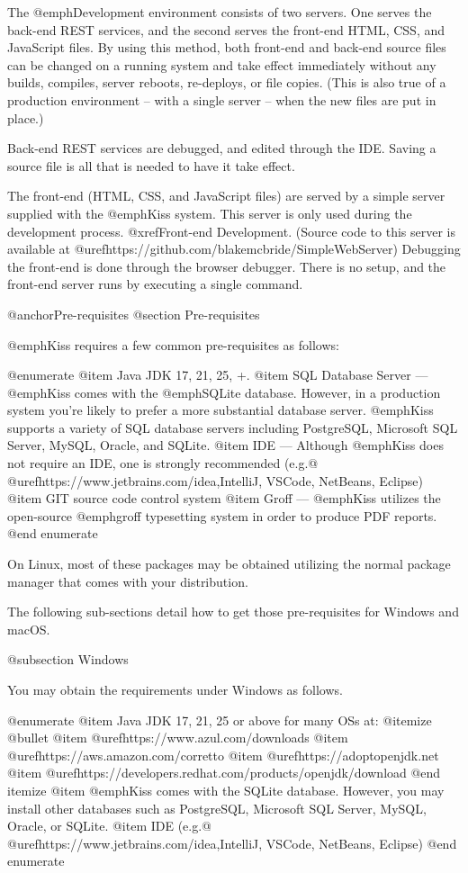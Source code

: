 The @emph{Development} environment consists of two servers.  One
serves the back-end REST services, and the second serves the front-end
HTML, CSS, and JavaScript files.  By using this method, both front-end
and back-end source files can be changed on a running system and take
effect immediately without any builds, compiles, server reboots,
re-deploys, or file copies.  (This is also true of a production
environment -- with a single server -- when the new files are put in place.)

Back-end REST services are debugged, and edited through the IDE.
Saving a source file is all that is needed to have it take effect.

The front-end (HTML, CSS, and JavaScript files) are served by a simple
server supplied with the @emph{Kiss} system.  This server is only used
during the development process.  @xref{Front-end Development}.
(Source code to this server is available at
@uref{https://github.com/blakemcbride/SimpleWebServer}) Debugging the
front-end is done through the browser debugger.  There is no setup,
and the front-end server runs by executing a single command.

@anchor{Pre-requisites}
@section Pre-requisites

@emph{Kiss} requires a few common pre-requisites as follows:


@enumerate
@item
Java JDK 17, 21, 25, +. 
@item
SQL Database Server --- @emph{Kiss} comes with the @emph{SQLite} database.  However, in a production
system you're likely to prefer a more substantial database server.  @emph{Kiss} supports a variety of SQL database servers including 
PostgreSQL, Microsoft SQL Server, MySQL, Oracle, and SQLite.
@item
IDE --- Although @emph{Kiss} does not require an IDE, one is strongly recommended (e.g.@ @uref{https://www.jetbrains.com/idea,IntelliJ}, VSCode, NetBeans, Eclipse)
@item
GIT source code control system
@item
Groff --- @emph{Kiss} utilizes the open-source @emph{groff} typesetting system in order to produce PDF reports.
@end enumerate

On Linux, most of these packages may be obtained utilizing the normal
package manager that comes with your distribution.

The following sub-sections detail how to get those pre-requisites for Windows and macOS.

@subsection Windows


You may obtain the requirements under Windows as follows.

@enumerate
@item
Java JDK 17, 21, 25 or above for many OSs at:
@itemize @bullet
@item
@uref{https://www.azul.com/downloads}
@item
@uref{https://aws.amazon.com/corretto}
@item
@uref{https://adoptopenjdk.net}
@item
@uref{https://developers.redhat.com/products/openjdk/download}
@end itemize
@item
@emph{Kiss} comes with the SQLite database.  However, you may install other databases such as PostgreSQL, Microsoft SQL Server, MySQL,
Oracle, or SQLite.
@item
IDE (e.g.@ @uref{https://www.jetbrains.com/idea,IntelliJ}, VSCode, NetBeans, Eclipse)
@end enumerate

